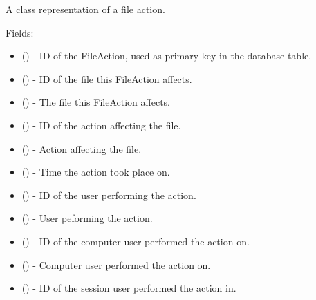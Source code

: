 \documentclass[letterpaper,10pt,english]{sphinxmanual}
\begin{document}
\begin{fulllineitems}
\label{models:models.FileAction}
A class representation of a file action.

Fields:
\begin{itemize}
\item {} 
        ()        - ID of the FileAction, used as primary key in the database table.

\item {} 
        ()        - ID of the file this FileAction affects.

\item {} 
 ()        - The file this FileAction affects.

\item {} 
        ()        - ID of the action affecting the file.

\item {} 
 ()        - Action affecting the file.

\item {} 
        ()        - Time the action took place on.

\item {} 
        ()        - ID of the user performing the action.

\item {} 
 ()        - User peforming the action.

\item {} 
        ()        - ID of the computer user performed the action on.

\item {} 
 ()        - Computer user performed the action on.

\item {} 
        ()        - ID of the session user performed the action in.


\end{itemize}
\end{fulllineitems}
\end{document}
